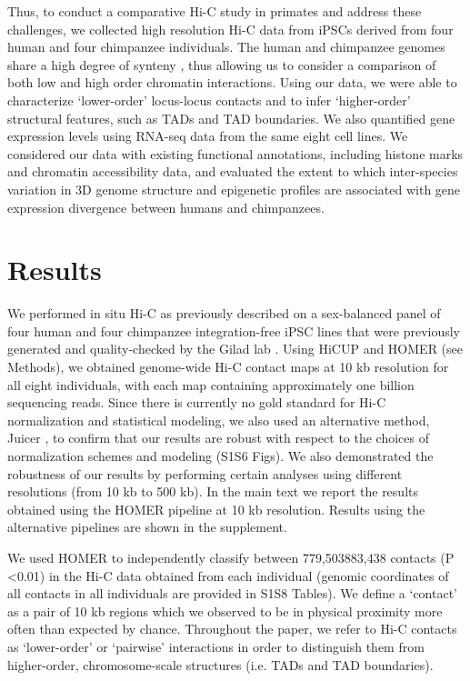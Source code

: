 Thus, to conduct a comparative Hi-C study in primates and address these challenges, we collected high resolution Hi-C data from iPSCs derived from four human and four chimpanzee individuals. The human and chimpanzee genomes share a high degree of synteny \cite{Yunis.1982, Yunis.1980, Scally.2012, Kehrer-sawatzki.2007, Catacchio.2018, Lee.2016}, thus allowing us to consider a comparison of both low and high order chromatin interactions. Using our data, we were able to characterize `lower-order' locus-locus contacts and to infer `higher-order' structural features, such as TADs and TAD boundaries. We also quantified gene expression levels using RNA-seq data from the same eight cell lines. We considered our data with existing functional annotations, including histone marks and chromatin accessibility data, and evaluated the extent to which inter-species variation in 3D genome structure and epigenetic profiles are associated with gene expression divergence between humans and chimpanzees.

\section{Results}\label{ch02-results}

We performed in situ Hi-C as previously described \cite{Rao.2014} on a sex-balanced panel of four human and four chimpanzee integration-free iPSC lines that were previously generated and quality-checked by the Gilad lab \cite{Romero.2015}. Using HiCUP \cite{Wingett.2015} and HOMER \cite{Heinz.2010} (see Methods), we obtained genome-wide Hi-C contact maps at 10 kb resolution for all eight individuals, with each map containing approximately one billion sequencing reads. Since there is currently no gold standard for Hi-C normalization and statistical modeling, we also used an alternative method, Juicer \cite{Durand.2016}, to confirm that our results are robust with respect to the choices of normalization schemes and modeling (S1{\textendash}S6 Figs). We also demonstrated the robustness of our results by performing certain analyses using different resolutions (from 10 kb to 500 kb). In the main text we report the results obtained using the HOMER pipeline at 10 kb resolution. Results using the alternative pipelines are shown in the supplement.

We used HOMER to independently classify between 779,503{\textendash}883,438 contacts (P \textless 0.01) in the Hi-C data obtained from each individual (genomic coordinates of all contacts in all individuals are provided in S1{\textendash}S8 Tables). We define a `contact' as a pair of 10 kb regions which we observed to be in physical proximity more often than expected by chance. Throughout the paper, we refer to Hi-C contacts as `lower-order' or `pairwise' interactions in order to distinguish them from higher-order, chromosome-scale structures (i.e. TADs and TAD boundaries).

